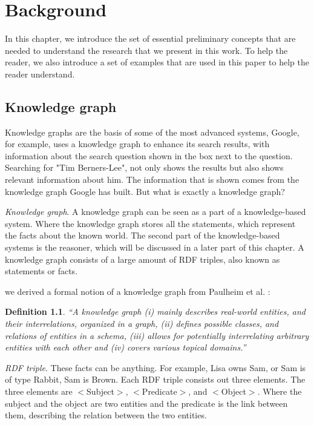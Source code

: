 \documentclass[11pt,letterpaper ,oneside ]{book}
\newtheorem{definition}{Definition}
\begin{document}
	
	
	\newpage
	\chapter{Background}\label{Background}
	In this chapter, we introduce the set of essential preliminary concepts that are needed to understand the research that we present in this work. To help the reader, we also introduce a set of examples that are used in this paper to help the reader understand.
	
	\section{Knowledge graph}\label{graphElements}
	Knowledge graphs are the basis of some of the most advanced systems, Google, for example, uses a knowledge graph to enhance its search results, with information about the search question shown in the box next to the question. Searching for "Tim Berners-Lee", not only shows the results but also shows relevant information about him. The information that is shown comes from the knowledge graph Google has built. But what is exactly a knowledge graph?
	
	\textit{Knowledge graph}. 
	A knowledge graph can be seen as a part of a knowledge-based system. Where the knowledge graph stores all the statements, which represent the facts about the known world. The second part of the knowledge-based systems is the reasoner, which will be discussed in a later part of this chapter. A knowledge graph consists of a large amount of RDF triples, also known as statements or facts.
	
	we derived a formal notion of a knowledge graph from Paulheim et al. \cite{HeikoP:2016}:
	\begin{definition} 
		“A knowledge graph (i) mainly describes real-world entities, and their interrelations, organized in a graph, (ii) defines possible classes, and relations of entities in a schema, (iii) allows for potentially interrelating arbitrary entities with each other and (iv) covers various topical domains.”
	\end{definition}
	
	\textit{RDF triple}. These facts can be anything. For example, Lisa owns Sam, or Sam is of type Rabbit, Sam is Brown. Each RDF triple consists out three elements.
	The three elements are $<$Subject$>$, $<$Predicate$>$, and $<$Object$>$. Where the subject and the object are two entities and the predicate is the link between them, describing the relation between the two entities. 
	
\end{document}
